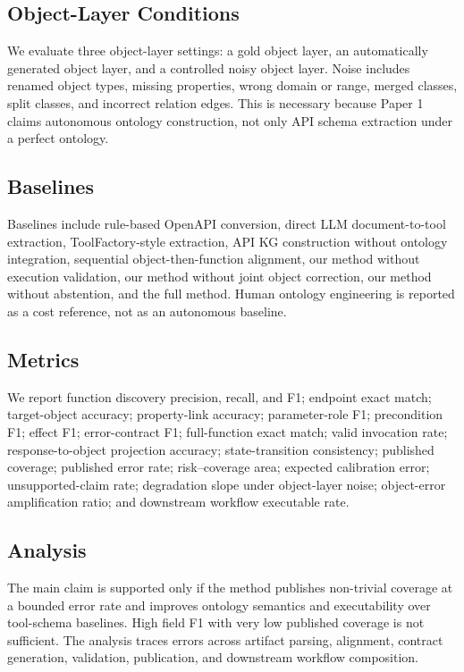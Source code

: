 \documentclass[10pt,twocolumn]{article}
\begin{document}
\subsection{Object-Layer Conditions}
We evaluate three object-layer settings: a gold object layer, an automatically generated object layer, and a controlled noisy object layer. Noise includes renamed object types, missing properties, wrong domain or range, merged classes, split classes, and incorrect relation edges. This is necessary because Paper 1 claims autonomous ontology construction, not only API schema extraction under a perfect ontology.

\subsection{Baselines}
Baselines include rule-based OpenAPI conversion, direct LLM document-to-tool extraction, ToolFactory-style extraction, API KG construction without ontology integration, sequential object-then-function alignment, our method without execution validation, our method without joint object correction, our method without abstention, and the full method. Human ontology engineering is reported as a cost reference, not as an autonomous baseline.

\subsection{Metrics}
We report function discovery precision, recall, and F1; endpoint exact match; target-object accuracy; property-link accuracy; parameter-role F1; precondition F1; effect F1; error-contract F1; full-function exact match; valid invocation rate; response-to-object projection accuracy; state-transition consistency; published coverage; published error rate; risk--coverage area; expected calibration error; unsupported-claim rate; degradation slope under object-layer noise; object-error amplification ratio; and downstream workflow executable rate.

\subsection{Analysis}
The main claim is supported only if the method publishes non-trivial coverage at a bounded error rate and improves ontology semantics and executability over tool-schema baselines. High field F1 with very low published coverage is not sufficient. The analysis traces errors across artifact parsing, alignment, contract generation, validation, publication, and downstream workflow composition.
\end{document}
